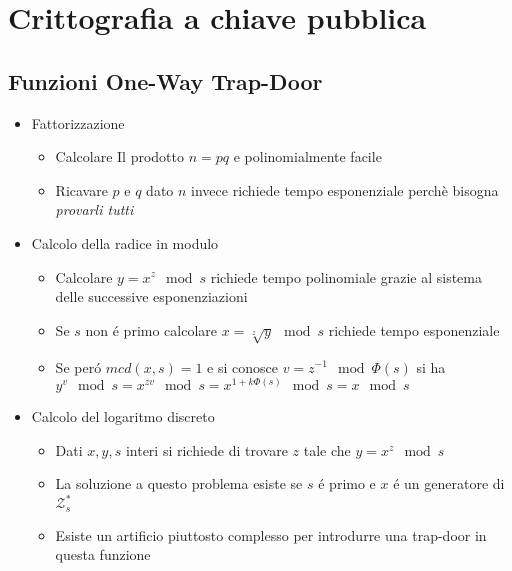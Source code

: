 \chapter{Crittografia a chiave pubblica}

\section{Funzioni One-Way Trap-Door}

\begin{itemize}
    \item Fattorizzazione
    \begin{itemize}
        \item Calcolare Il prodotto $n = pq$ e polinomialmente facile
        \item Ricavare $p$ e $q$ dato $n$ invece richiede tempo esponenziale perch\`e bisogna \textit{provarli tutti}
    \end{itemize}
    \item Calcolo della radice in modulo
    \begin{itemize}
        \item Calcolare $y = x^z \mod{s}$ richiede tempo polinomiale grazie al sistema delle successive esponenziazioni
        \item Se $s$ non \'e primo calcolare $x = \sqrt[z]{y} \mod{s}$ richiede tempo esponenziale
        \item Se per\'o $mcd(x, s) = 1$ e si conosce $v = z^{-1} \mod{\Phi(s)}$ si ha\\$y^v \mod{s} = x^{zv} \mod{s} = x^{1 + k\Phi(s)} \mod{s} = x \mod{s}$
    \end{itemize}
    \item Calcolo del logaritmo discreto
    \begin{itemize}
        \item Dati $x, y, s$ interi si richiede di trovare $z$ tale che $y = x^z \mod{s}$ 
        \item La soluzione a questo problema esiste se $s$ \'e primo e $x$ \'e un generatore di $\mathcal{Z}_s^*$
        \item Esiste un artificio piuttosto complesso per introdurre una trap-door in questa funzione
    \end{itemize}
\end{itemize}

\newpage
